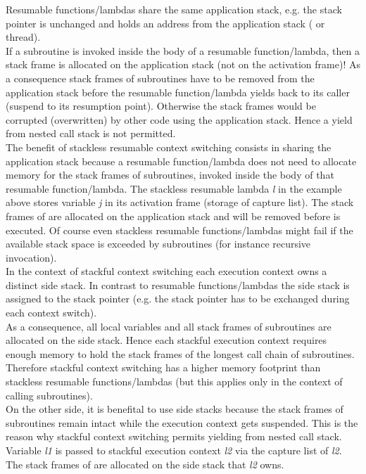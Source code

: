 Resumable functions/lambdas share the same application stack, e.g. the stack
pointer is unchanged and holds an address from the application stack ( \main or
thread).\\
If a subroutine is invoked inside the body of a resumable function/lambda, then
a stack frame is allocated on the application stack (not on the activation
frame)! As a consequence stack frames of subroutines have to be removed from the
application stack before the resumable function/lambda yields back to its caller
(suspend to its resumption point). Otherwise the stack frames would be corrupted
(overwritten) by other code using the application stack. Hence a yield from
nested call stack is not permitted.\\
The benefit of stackless resumable context switching consists in sharing the
application stack because a resumable function/lambda does not need to allocate
memory for the stack frames of subroutines, invoked inside the body of that
resumable function/lambda.
The stackless resumable lambda \textit{l} in the example above stores variable 
\textit{j} in its activation frame (storage of capture list). The stack frames of
 are allocated on the application stack and will be removed
before \yield is executed.
\newline
Of course even stackless resumable functions/lambdas might fail if the available
stack space is exceeded by subroutines (for instance recursive invocation).\\
\newline
In the context of stackful context switching each execution context owns a
distinct side stack. In contrast to resumable functions/lambdas the side stack
is assigned to the stack pointer (e.g. the stack pointer has to be exchanged
during each context switch).\\
As a consequence, all local variables and all stack frames of subroutines are
allocated on the side stack. Hence each stackful execution context requires
enough memory to hold the stack frames of the longest call chain of subroutines.
Therefore stackful context switching has a higher memory footprint than
stackless resumable functions/lambdas (but this applies only in the context of
calling subroutines).\\
On the other side, it is benefital to use side stacks because the stack frames
of subroutines remain intact while the execution context gets suspended. This is
the reason why stackful context switching permits yielding from nested call
stack.
Variable \textit{l1} is passed to stackful execution context \textit{l2} via
the capture list of \textit{l2}. The stack frames of  are
allocated on the side stack that \textit{l2} owns.
